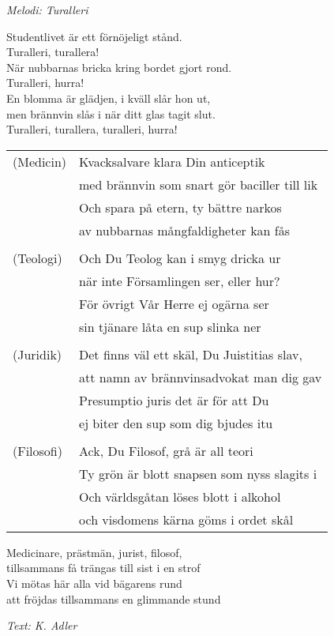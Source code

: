{\footnotesize\textit{Melodi: Turalleri}}\par
\vspace{10pt}
Studentlivet är ett förnöjeligt stånd.\\
Turalleri, turallera!\\
När nubbarnas bricka kring bordet gjort rond.\\
Turalleri, hurra!\\
En blomma är glädjen, i kväll slår hon ut,\\
men brännvin slås i när ditt glas tagit slut.\\
Turalleri, turallera, turalleri, hurra!\par
\vspace{10pt}
\begin{tabular}{l l}
(Medicin)  & Kvacksalvare klara Din anticeptik \\
           & med brännvin som snart gör baciller till lik\\
           & Och spara på etern, ty bättre narkos\\
           & av nubbarnas mångfaldigheter kan fås\\
           \\
(Teologi)  & Och Du Teolog kan i smyg dricka ur \\
           & när inte Församlingen ser, eller hur? \\
           & För övrigt Vår Herre ej ogärna ser\\
           & sin tjänare låta en sup slinka ner\\
           \\
(Juridik)  & Det finns väl ett skäl, Du Juistitias slav, \\
           & att namn av brännvinsadvokat man dig gav \\
           & Presumptio juris det är för att Du\\
           & ej biter den sup som dig bjudes itu\\
           \\
(Filosofi) & Ack, Du Filosof, grå är all teori \\
           & Ty grön är blott snapsen som nyss slagits i \\
           & Och världsgåtan löses blott i alkohol\\
           & och visdomens kärna göms i ordet skål
\end{tabular}\par
\newpage
Medicinare, prästmän, jurist, filosof,\\
tillsammans få trängas till sist i en strof\\
Vi mötas här alla vid bägarens rund\\
att fröjdas tillsammans en glimmande stund\par
\vspace{10pt}
{\footnotesize\textit{Text: K. Adler}}
